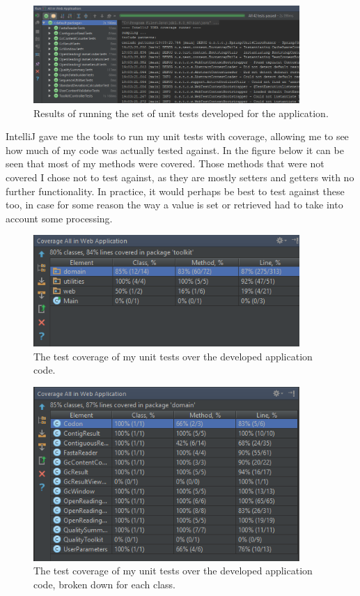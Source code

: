 \begin{figure}[H]
\centering
\includegraphics[width=0.9\textwidth]{images/unittestsuccess}
\caption{Results of running the set of unit tests developed for the application.}
\end{figure}

IntelliJ gave  me the tools to run my unit tests with coverage, allowing me to see how much of my code was actually tested against. In the figure below it can be seen that most of my methods were covered. Those methods that were not covered I chose not to test against, as they are mostly setters and getters with no further functionality. In practice, it would perhaps be best to test against these too, in case for some reason the way a value is set or retrieved had to take into account some processing.

\begin{figure}[H]
\centering
\includegraphics[width=0.9\textwidth]{images/testcoverage1}
\caption{The test coverage of my unit tests over the developed application code.}
\end{figure}

\begin{figure}[H]
\centering
\includegraphics[width=0.9\textwidth]{images/testcoverage2}
\caption{The test coverage of my unit tests over the developed application code, broken down for each class.}
\end{figure}

